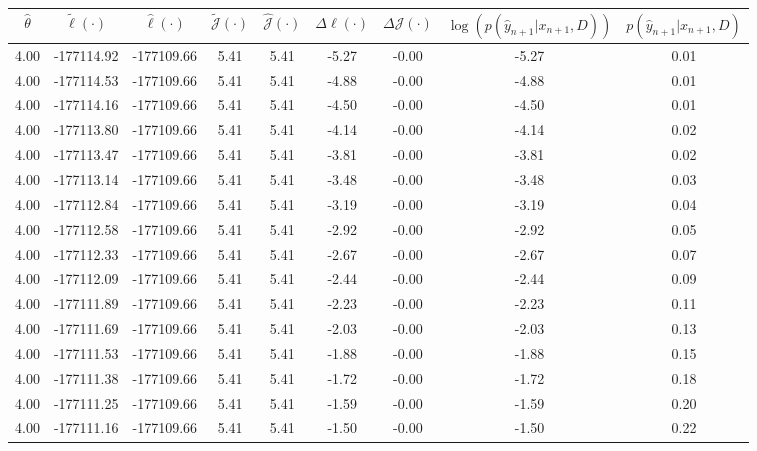 \begin{table}[htbp]
        \centering
        \tiny
        \begin{adjustbox}{angle=90}
            \begin{tabular}{|c|c|c|c|c|c|c|c|c|}
                \hline
                 $\hat{\theta}$ & $\tilde{\ell}(\cdot)$ & $\hat{\ell}(\cdot)$ & $\tilde{\mathcal{J}}(\cdot)$ & $\hat{\mathcal{J}}(\cdot)$ & $\Delta \ell(\cdot)$ & $\Delta \mathcal{J}(\cdot)$ & $\log(p(\hat{y}_{n+1}|x_{n+1}, D))$ & $p(\hat{y}_{n+1}|x_{n+1}, D)$ \\
                \hline
                 4.00 & -177114.92 & -177109.66 & 5.41 & 5.41 & -5.27 & -0.00 & -5.27 & 0.01\\ \hline
 4.00 & -177114.53 & -177109.66 & 5.41 & 5.41 & -4.88 & -0.00 & -4.88 & 0.01\\ \hline
 4.00 & -177114.16 & -177109.66 & 5.41 & 5.41 & -4.50 & -0.00 & -4.50 & 0.01\\ \hline
 4.00 & -177113.80 & -177109.66 & 5.41 & 5.41 & -4.14 & -0.00 & -4.14 & 0.02\\ \hline
 4.00 & -177113.47 & -177109.66 & 5.41 & 5.41 & -3.81 & -0.00 & -3.81 & 0.02\\ \hline
 4.00 & -177113.14 & -177109.66 & 5.41 & 5.41 & -3.48 & -0.00 & -3.48 & 0.03\\ \hline
 4.00 & -177112.84 & -177109.66 & 5.41 & 5.41 & -3.19 & -0.00 & -3.19 & 0.04\\ \hline
 4.00 & -177112.58 & -177109.66 & 5.41 & 5.41 & -2.92 & -0.00 & -2.92 & 0.05\\ \hline
 4.00 & -177112.33 & -177109.66 & 5.41 & 5.41 & -2.67 & -0.00 & -2.67 & 0.07\\ \hline
 4.00 & -177112.09 & -177109.66 & 5.41 & 5.41 & -2.44 & -0.00 & -2.44 & 0.09\\ \hline
 4.00 & -177111.89 & -177109.66 & 5.41 & 5.41 & -2.23 & -0.00 & -2.23 & 0.11\\ \hline
 4.00 & -177111.69 & -177109.66 & 5.41 & 5.41 & -2.03 & -0.00 & -2.03 & 0.13\\ \hline
 4.00 & -177111.53 & -177109.66 & 5.41 & 5.41 & -1.88 & -0.00 & -1.88 & 0.15\\ \hline
 4.00 & -177111.38 & -177109.66 & 5.41 & 5.41 & -1.72 & -0.00 & -1.72 & 0.18\\ \hline
 4.00 & -177111.25 & -177109.66 & 5.41 & 5.41 & -1.59 & -0.00 & -1.59 & 0.20\\ \hline
 4.00 & -177111.16 & -177109.66 & 5.41 & 5.41 & -1.50 & -0.00 & -1.50 & 0.22\\ \hline

\end{tabular}
\end{adjustbox}
\end{table}
